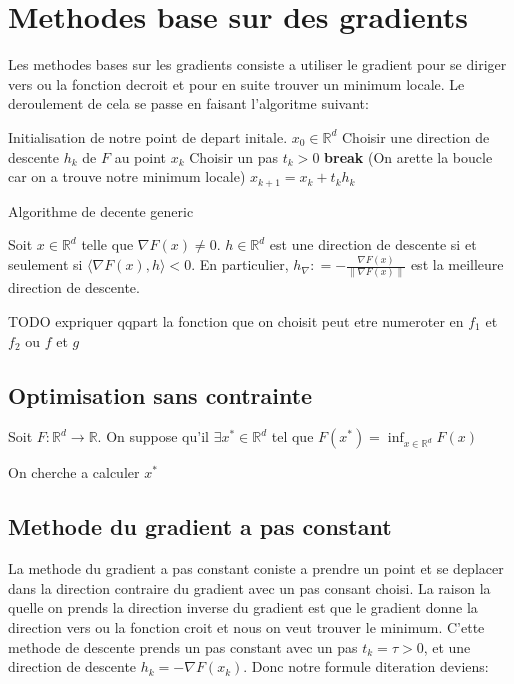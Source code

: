 \section{Methodes base sur des gradients} \label{grad_methods}
Les methodes bases sur les gradients consiste a utiliser le gradient pour se diriger vers ou la fonction decroit et pour en suite trouver un minimum locale. Le deroulement de cela se passe en faisant l'algoritme suivant:
\begin{algorithm}[H]
    \begin{algorithmic}
        \State Initialisation de notre point de depart initale. $x_0 \in \mathbb{R}^d$
            \State Choisir une direction de descente $h_k$ de $F$ au point $x_k$
            \State Choisir un pas $t_k > 0$
                \State \textbf{break} (On arette la boucle car on a trouve notre minimum locale)
            \EndIf
            \State $x_{k+1} = x_k + t_k h_k$
        \EndFor   
    \end{algorithmic}
    \caption{Algorithme de decente generic} %
\end{algorithm}


\begin{lemma} 
Soit $x \in \mathbb{R}^d $ telle que $\nabla F(x) \neq 0$. $h \in \mathbb{R}^d$ est une direction de descente si et seulement si $\langle \nabla F(x), h \rangle < 0$. En particulier, $h_{\nabla} : = -\frac{\nabla F(x)}{\lVert \nabla F(x) \rVert}$ est la meilleure direction de descente.
\end{lemma}

TODO expriquer qqpart la fonction que on choisit peut etre numeroter en $f_1$ et $f_2$ ou $f$ et $g$ 

\subsection{Optimisation sans contrainte}

Soit $F:\mathbb{R}^d \rightarrow \mathbb{R}$. On suppose qu'il $\exists  x^* \in \mathbb{R}^d$ tel que $F(x^*) = \inf_{x \in \mathbb{R}^d} F(x)$

On cherche a calculer $x^*$



\subsection{Methode du gradient a pas constant}
La methode du gradient a pas constant coniste a prendre un point et se deplacer dans la direction contraire du gradient avec un pas consant choisi. La raison la quelle on prends la direction inverse du gradient est que le gradient donne la direction vers ou la fonction croit et nous on veut trouver le minimum. C'ette methode de descente prends un pas constant avec un pas $t_k = \tau > 0$, et une direction de descente $ h_k = - \nabla F(x_k)$. Donc notre formule diteration deviens: 

